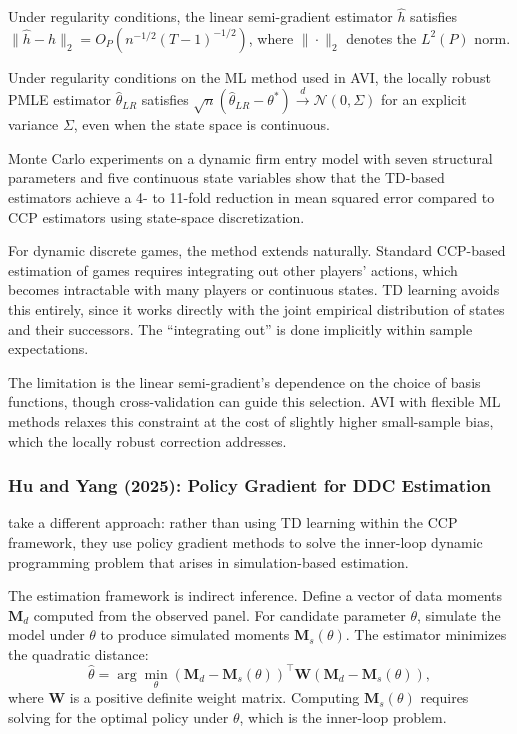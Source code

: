 \begin{theorem}
Under regularity conditions, the linear semi-gradient estimator $\hat{h}$ satisfies $\|\hat{h} - h\|_2 = O_P(n^{-1/2}(T-1)^{-1/2})$, where $\|\cdot\|_2$ denotes the $L^2(P)$ norm.
\end{theorem}

\begin{theorem}
Under regularity conditions on the ML method used in AVI, the locally robust PMLE estimator $\hat{\theta}_{LR}$ satisfies $\sqrt{n}(\hat{\theta}_{LR} - \theta^*) \xrightarrow{d} \mathcal{N}(0, \Sigma)$ for an explicit variance $\Sigma$, even when the state space is continuous.
\end{theorem}

Monte Carlo experiments on a dynamic firm entry model with seven structural parameters and five continuous state variables show that the TD-based estimators achieve a 4- to 11-fold reduction in mean squared error compared to CCP estimators using state-space discretization.

For dynamic discrete games, the method extends naturally. Standard CCP-based estimation of games requires integrating out other players' actions, which becomes intractable with many players or continuous states. TD learning avoids this entirely, since it works directly with the joint empirical distribution of states and their successors. The ``integrating out'' is done implicitly within sample expectations.

The limitation is the linear semi-gradient's dependence on the choice of basis functions, though cross-validation can guide this selection. AVI with flexible ML methods relaxes this constraint at the cost of slightly higher small-sample bias, which the locally robust correction addresses.


\subsubsection{Hu and Yang (2025): Policy Gradient for DDC Estimation}

\citet{HuYang2025} take a different approach: rather than using TD learning within the CCP framework, they use policy gradient methods to solve the inner-loop dynamic programming problem that arises in simulation-based estimation.

The estimation framework is indirect inference. Define a vector of data moments $\mathbf{M}_d$ computed from the observed panel. For candidate parameter $\theta$, simulate the model under $\theta$ to produce simulated moments $\mathbf{M}_s(\theta)$. The estimator minimizes the quadratic distance:
\begin{equation}
\hat{\theta} = \arg\min_{\theta} \left(\mathbf{M}_d - \mathbf{M}_s(\theta)\right)^\top \mathbf{W} \left(\mathbf{M}_d - \mathbf{M}_s(\theta)\right), \label{eq:hy_outer}
\end{equation}
where $\mathbf{W}$ is a positive definite weight matrix. Computing $\mathbf{M}_s(\theta)$ requires solving for the optimal policy under $\theta$, which is the inner-loop problem.


